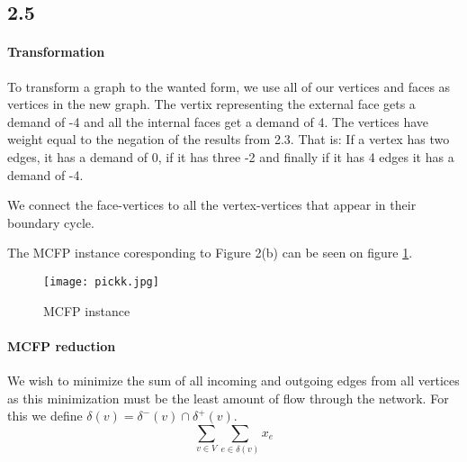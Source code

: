 \subsection*{2.5}

\paragraph{Transformation}

To transform a graph to the wanted form, we use all of our vertices
and faces as vertices in the new graph. The vertix representing the
external face gets a demand of -4 and all the internal faces get a
demand of 4. The vertices have weight equal to the negation of the results
from 2.3. That is: If a vertex has two edges, it has a demand of 0, if it
has three -2 and finally if it has 4 edges it has a demand of -4. 

We connect the face-vertices to all the vertex-vertices that appear in
their boundary cycle. 

The MCFP instance coresponding to Figure 2(b) can be seen on figure \ref{yoloswag}.
\begin{figure}
    \texttt{[image: pickk.jpg]}
    \caption{MCFP instance}
    \label{yoloswag}
\end{figure}


\paragraph{MCFP reduction}
 
We wish to minimize the sum of all incoming and outgoing edges from all vertices as this
minimization must be the least amount of flow through the network. For this we define $\delta(v) = \delta^{-}(v) \cap \delta^{+}(v)$.
\begin{equation}
    \sum\limits_{v \in V}\sum\limits_{e \in \delta(v)}x_e
\end{equation}


